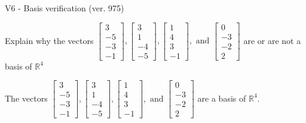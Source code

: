 \begin{exercise}
  \begin{exerciseTitle}V6 - Basis verification (ver. 975)\end{exerciseTitle}
  \begin{exerciseStatement}
    Explain why the vectors \(\left[\begin{array}{r}
3 \\
-5 \\
-3 \\
-1
\end{array}\right] , \left[\begin{array}{r}
3 \\
1 \\
-4 \\
-5
\end{array}\right] , \left[\begin{array}{r}
1 \\
4 \\
3 \\
-1
\end{array}\right] , \text{ and } \left[\begin{array}{r}
0 \\
-3 \\
-2 \\
2
\end{array}\right]\) are or are not a basis of \(\mathbb{R}^4\)	


  \end{exerciseStatement}
  \begin{exerciseAnswer}
   The vectors \(\left[\begin{array}{r}
3 \\
-5 \\
-3 \\
-1
\end{array}\right] , \left[\begin{array}{r}
3 \\
1 \\
-4 \\
-5
\end{array}\right] , \left[\begin{array}{r}
1 \\
4 \\
3 \\
-1
\end{array}\right] , \text{ and } \left[\begin{array}{r}
0 \\
-3 \\
-2 \\
2
\end{array}\right]\) 
  	 are  a basis of \(\mathbb{R}^4\).
  


  \end{exerciseAnswer}
\end{exercise}